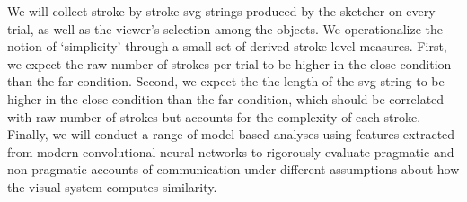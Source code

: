 \documentclass[11pt, oneside]{article}   	%
\begin{document}
We will collect stroke-by-stroke svg strings produced by the sketcher on every trial, as well as the viewer's selection among the objects. We operationalize the notion of `simplicity' through a small set of derived stroke-level measures. First, we expect the raw number of strokes per trial to be higher in the close condition than the far condition. Second, we expect the the length of the svg string to be higher in the close condition than the far condition, which should be correlated with raw number of strokes but accounts for the complexity of each stroke. Finally, we will conduct a range of model-based analyses using features extracted from modern convolutional neural networks to rigorously evaluate pragmatic and non-pragmatic accounts of communication under different assumptions about how the visual system computes similarity. 
\end{document}
